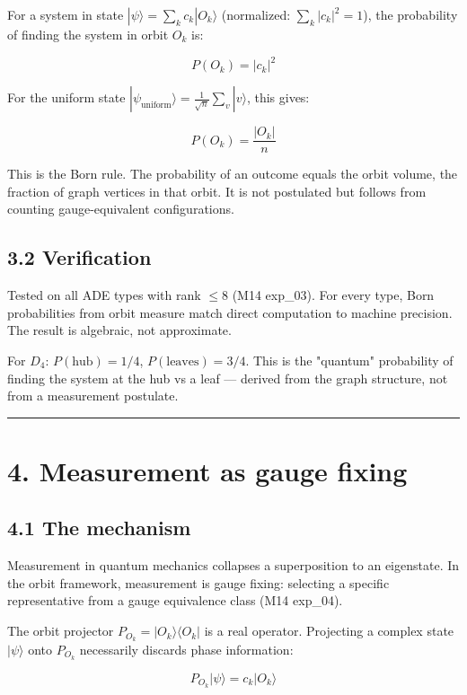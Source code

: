 \documentclass[11pt,a4paper]{article}
\begin{document}
For a system in state $|\psi\rangle = \sum_k c_k |O_k\rangle$ (normalized: $\sum_k |c_k|^2 = 1$), the probability of finding the system in orbit $O_k$ is:

\[P(O_k) = |c_k|^2\]

For the uniform state $|\psi_{\text{uniform}}\rangle = \frac{1}{\sqrt{n}} \sum_v |v\rangle$, this gives:

\[P(O_k) = \frac{|O_k|}{n}\]

This is the Born rule. The probability of an outcome equals the orbit volume, the fraction of graph vertices in that orbit. It is not postulated but follows from counting gauge-equivalent configurations.

\subsection*{3.2 Verification}

Tested on all ADE types with rank $\leq 8$ (M14 exp\_03). For every type, Born probabilities from orbit measure match direct computation to machine precision. The result is algebraic, not approximate.

For $D_4$: $P(\text{hub}) = 1/4$, $P(\text{leaves}) = 3/4$. This is the "quantum" probability of finding the system at the hub vs a leaf — derived from the graph structure, not from a measurement postulate.

\begin{center}\rule{0.5\linewidth}{0.4pt}\end{center}

\section*{4. Measurement as gauge fixing}

\subsection*{4.1 The mechanism}

Measurement in quantum mechanics collapses a superposition to an eigenstate. In the orbit framework, measurement is gauge fixing: selecting a specific representative from a gauge equivalence class (M14 exp\_04).

The orbit projector $P_{O_k} = |O_k\rangle\langle O_k|$ is a real operator. Projecting a complex state $|\psi\rangle$ onto $P_{O_k}$ necessarily discards phase information:

\[P_{O_k} |\psi\rangle = c_k |O_k\rangle\]
\end{document}
